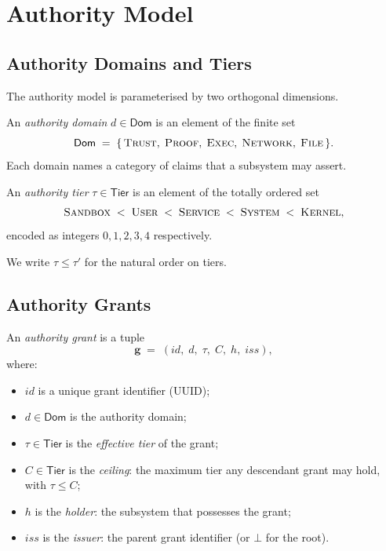 \documentclass[11pt]{article}
\newcommand{\ADom}{\mathsf{Dom}}            %
\newcommand{\ATier}{\mathsf{Tier}}          %
\newcommand{\AGrant}{\mathbf{g}}            %
\newcommand{\TierKERNEL}{\textsc{Kernel}}
\newcommand{\TierSYSTEM}{\textsc{System}}
\newcommand{\TierSERVICE}{\textsc{Service}}
\newcommand{\TierUSER}{\textsc{User}}
\newcommand{\TierSANDBOX}{\textsc{Sandbox}}
\newcommand{\DomTRUST}{\textsc{Trust}}
\newcommand{\DomPROOF}{\textsc{Proof}}
\newcommand{\DomEXEC}{\textsc{Exec}}
\newcommand{\DomNETWORK}{\textsc{Network}}
\newcommand{\DomFILE}{\textsc{File}}
\begin{document}
\section{Authority Model}\label{sec:model}

\subsection{Authority Domains and Tiers}

The authority model is parameterised by two orthogonal dimensions.

\begin{definition}\label{def:domain}
An \emph{authority domain} $d \in \ADom$ is an element of the
finite set
\[
  \ADom \;=\;
  \{\,\DomTRUST,\;\DomPROOF,\;\DomEXEC,\;\DomNETWORK,\;\DomFILE\,\}.
\]
Each domain names a category of claims that a subsystem may assert.
\end{definition}

\begin{definition}\label{def:tier}
An \emph{authority tier} $\tau \in \ATier$ is an element of the
totally ordered set
\[
  \TierSANDBOX \;<\; \TierUSER \;<\; \TierSERVICE \;<\;
  \TierSYSTEM \;<\; \TierKERNEL,
\]
encoded as integers $0,1,2,3,4$ respectively.
\end{definition}

We write $\tau \leq \tau'$ for the natural order on tiers.

\subsection{Authority Grants}

\begin{definition}\label{def:grant}
An \emph{authority grant} is a tuple
\[
  \AGrant \;=\; (\mathit{id},\; d,\; \tau,\; C,\; h,\; \mathit{iss}),
\]
where:
\begin{itemize}[leftmargin=1.5em,itemsep=2pt]
  \item $\mathit{id}$ is a unique grant identifier (UUID);
  \item $d \in \ADom$ is the authority domain;
  \item $\tau \in \ATier$ is the \emph{effective tier} of the grant;
  \item $C \in \ATier$ is the \emph{ceiling}: the maximum tier any
        descendant grant may hold, with $\tau \leq C$;
  \item $h$ is the \emph{holder}: the subsystem that possesses the grant;
  \item $\mathit{iss}$ is the \emph{issuer}: the parent grant identifier
        (or $\bot$ for the root).
\end{itemize}
\end{definition}
\end{document}
